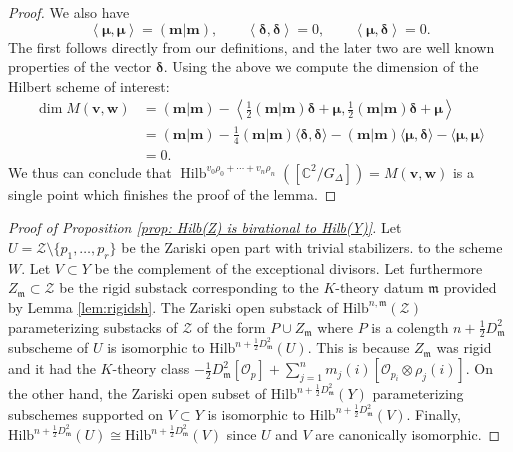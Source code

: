 \documentclass{amsart}
\theoremstyle{definition}
\newcommand{\half}{\frac{1}{2}}
\newcommand{\CC} {{\mathbb C}}          %
\newcommand{\mdata}{\mathfrak{m}}
\renewcommand{\O}{\mathcal{O}}
\newcommand{\Zcal}{\mathcal{Z}}
\newcommand{\mvec}{\bm{m}}
\newcommand{\deltavec}{\bm{\delta  }}
\newcommand{\muvec}{\bm{\mu  }}
\newcommand{\vvec}{\bm{v }}
\newcommand{\wvec}{\bm{w }}
\newcommand{\Hilb}{\operatorname{Hilb}}
\begin{document}
\begin{proof}
We also have
\[
\left\langle \muvec ,\muvec \right\rangle = (\mvec |\mvec ),\quad
\quad \left\langle \deltavec ,\deltavec \right\rangle = 0, \quad \quad
\left\langle \muvec ,\deltavec \right\rangle = 0.
\]
The first follows directly from our definitions, and the later two are
well known properties of the vector $\deltavec$.  Using the above we
compute the dimension of the Hilbert scheme of interest:
\begin{align*}
\dim M(\vvec ,\wvec ) &=
(\mvec| \mvec ) - \left\langle
\half ( \mvec| \mvec )\deltavec+\muvec ,\half ( \mvec| \mvec )\deltavec+\muvec  \right\rangle \\
& = (\mvec| \mvec )  -\frac{1}{4} ( \mvec|
\mvec)\langle \deltavec, \deltavec \rangle  - ( \mvec|
\mvec) \langle \muvec, \deltavec \rangle  - \langle \muvec, \muvec \rangle\\
& = 0.
\end{align*}
We thus can conclude that $\Hilb^{v_{0}\rho_{0}+\dotsb
+v_{n}\rho_{n}}([\CC^{2} /G_{\Delta}]) = M(\vvec ,\wvec )$ is a single
point which finishes the proof of the lemma.
\end{proof}



\begin{proof}[Proof of Proposition \ref{prop: Hilb(Z) is birational to
Hilb(Y)}] Let $U= \Zcal \setminus \{p_{1},\dotsc ,p_{r} \}$ be the
Zariski open part with trivial stabilizers. %
to the scheme $W$.  Let $V \subset Y$ be the complement of the
exceptional divisors.  Let furthermore $Z_{\mdata} \subset
\mathcal{Z}$ be the rigid substack corresponding to the $K$-theory
datum $\mdata$ provided by Lemma \ref{lem:rigidsh}.  The Zariski open
substack of $\mathrm{Hilb}^{n,\mdata}(\Zcal)$ parameterizing substacks
of $\Zcal$ of the form $P \cup Z_{\mdata}$ where $P$ is a colength
$n+\half D_{\mdata}^{2}$ subscheme of $U$ is isomorphic to
$\mathrm{Hilb}^{n+\half D_{\mdata}^{2}}(U)$. This is because
$Z_{\mdata}$ was rigid and it had the $K$-theory class $-\half
D_{\mdata}^{2}[\O_{p}] + \sum_{j=1}^{n} m_{j}(i)[\O_{p_i}\otimes
\rho_{j}(i)]$. On the other hand, the Zariski open subset of
$\mathrm{Hilb}^{n+\half D_{\mdata}^{2}}(Y)$ parameterizing subschemes
supported on $V\subset Y$ is isomorphic to $\mathrm{Hilb}^{n+\half
D_{\mdata}^{2}}(V)$. Finally, $\mathrm{Hilb}^{n+\half
D_{\mdata}^{2}}(U)\cong \mathrm{Hilb}^{n+\half D_{\mdata}^{2}}(V)$
since $U$ and $V$ are canonically isomorphic.
\end{proof}
\end{document}
